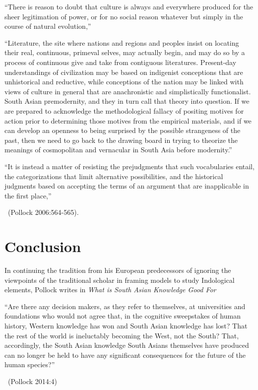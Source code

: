 \begin{myquote}
“There is reason to doubt that culture is always and everywhere produced for the sheer legitimation of power, or for no social reason whatever but simply in the course of natural evolution,”

“Literature, the site where nations and regions and peoples insist on locating their real, continuous, primeval selves, may actually begin, and may do so by a process of continuous give and take from contiguous literatures. Present-day understandings of civilization may be based on indigenist conceptions that are unhistorical and reductive, while conceptions of the nation may be linked with views of culture in general that are anachronistic and simplistically functionalist. South Asian premodernity, and they in turn call that theory into question. If we are prepared to acknowledge the methodological fallacy of positing motives for action prior to determining those motives from the empirical materials, and if we can develop an openness to being surprised by the possible strangeness of the past, then we need to go back to the drawing board in trying to theorize the meanings of cosmopolitan and vernacular in South Asia before modernity.”

“It is instead a matter of resisting the prejudgments that such vocabularies entail, the categorizations that limit alternative possibilities, and the historical judgments based on accepting the terms of an argument that are inapplicable in the first place,” 

\vskip -5pt

~\hfill (Pollock 2006:564-565).
\end{myquote}


\section{Conclusion}

In continuing the tradition from his European predecessors of ignoring the viewpoints of the traditional scholar in framing models to study Indological elements, Pollock writes in \textit{What is South Asian Knowledge Good For}

\begin{myquote}
“Are there any decision makers, as they refer to themselves, at universities and foundations who would not agree that, in the cognitive sweepstakes of human history, Western knowledge has won and South Asian knowledge has lost? That the rest of the world is ineluctably becoming the West, not the South? That, accordingly, the South Asian knowledge South Asians themselves have produced can no longer be held to have any significant consequences for the future of the human species?” 

\vskip -5pt

~\hfill (Pollock 2014:4)
\end{myquote}

